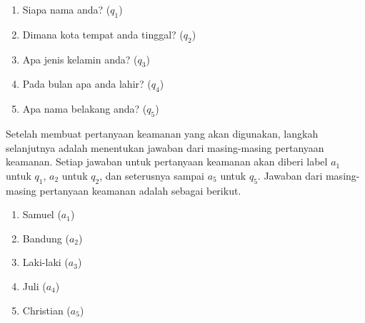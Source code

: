 \begin{enumerate}[itemsep=0mm]
	\item Siapa nama anda? (\begin{math}q_1\end{math})
	\item Dimana kota tempat anda tinggal? (\begin{math}q_2\end{math})
	\item Apa jenis kelamin anda? (\begin{math}q_3\end{math})
	\item Pada bulan apa anda lahir? (\begin{math}q_4\end{math})
	\item Apa nama belakang anda? (\begin{math}q_5\end{math})
\end{enumerate}

Setelah membuat pertanyaan keamanan yang akan digunakan, langkah selanjutnya adalah menentukan jawaban dari masing-masing pertanyaan keamanan. Setiap jawaban untuk pertanyaan keamanan akan diberi label \begin{math}a_1\end{math} untuk \begin{math}q_1\end{math}, \begin{math}a_2\end{math} untuk \begin{math}q_2\end{math}, dan seterusnya sampai \begin{math}a_5\end{math} untuk \begin{math}q_5\end{math}. Jawaban dari masing-masing pertanyaan keamanan adalah sebagai berikut.

\begin{enumerate}[itemsep=0mm]
	\item Samuel (\begin{math}a_1\end{math})
	\item Bandung (\begin{math}a_2\end{math})
	\item Laki-laki (\begin{math}a_3\end{math})
	\item Juli (\begin{math}a_4\end{math})
	\item Christian (\begin{math}a_5\end{math})
\end{enumerate}

